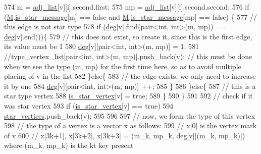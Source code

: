\begin{DoxyCode}
574       m = \hyperlink{classcolored__graph_a45dce16965079286cf3f41a54a1b2ea4}{adj\_list}[v][i].second.first;
575       mp = \hyperlink{classcolored__graph_a45dce16965079286cf3f41a54a1b2ea4}{adj\_list}[v][i].second.second;
576       \textcolor{keywordflow}{if} (\hyperlink{classcolored__graph_ab72c568fe12f7c849ca6bffb145aec47}{M}.\hyperlink{classgraph__message_a55ff5531a0043106369e84a7bc45e22d}{is\_star\_message}[m] == \textcolor{keyword}{false} and \hyperlink{classcolored__graph_ab72c568fe12f7c849ca6bffb145aec47}{M}.\hyperlink{classgraph__message_a55ff5531a0043106369e84a7bc45e22d}{is\_star\_message}[mp] == \textcolor{keyword}{false})
      \{
577         \textcolor{comment}{// this edge is not star type}
578         \textcolor{keywordflow}{if} (\hyperlink{classcolored__graph_ae3269d35c1b022bc70d195bebd4e1b8a}{deg}[v].find(pair<int, int>(m, mp)) == \hyperlink{classcolored__graph_ae3269d35c1b022bc70d195bebd4e1b8a}{deg}[v].end())\{
579           \textcolor{comment}{// this does not exist, so create it, since this is the first edge, its value must be 1}
580           \hyperlink{classcolored__graph_ae3269d35c1b022bc70d195bebd4e1b8a}{deg}[v][pair<int, int>(m, mp)] = 1;
581           \textcolor{comment}{//type\_vertex\_list[pair<int, int>(m, mp)].push\_back(v); // this must be done when we see the type
       (m, mp) for the first time here, so as to avoid multiple placing of v in the list }
582         \}\textcolor{keywordflow}{else}\{
583           \textcolor{comment}{// the edge exists, we only need to increase it by one}
584           \hyperlink{classcolored__graph_ae3269d35c1b022bc70d195bebd4e1b8a}{deg}[v][pair<int, int>(m, mp)] ++;
585         \}
586       \}\textcolor{keywordflow}{else}\{
587         \textcolor{comment}{// this is a star type vertex}
588         \hyperlink{classcolored__graph_ad41163e970530c7e45878d299f0dc961}{is\_star\_vertex}[v] = \textcolor{keyword}{true};
589       \}
590     \}
591 
592     \textcolor{comment}{// check if it was star vertex}
593     \textcolor{keywordflow}{if} (\hyperlink{classcolored__graph_ad41163e970530c7e45878d299f0dc961}{is\_star\_vertex}[v] == \textcolor{keyword}{true})
594       \hyperlink{classcolored__graph_ab7ee8d717abde7ad7467ef695038f574}{star\_vertices}.push\_back(v);
595 
596 
597     \textcolor{comment}{// now, we form the type of this vertex}
598     \textcolor{comment}{// the type of a vertex is a vector x as follows:}
599     \textcolor{comment}{// x[0] is the vertex mark of v}
600     \textcolor{comment}{// x[3k+1], x[3k+2], x[3k+3] = (m\_k, mp\_k, deg[v][(m\_k, mp\_k)]) where (m\_k, mp\_k) is the kt key present
}
\end{DoxyCode}
